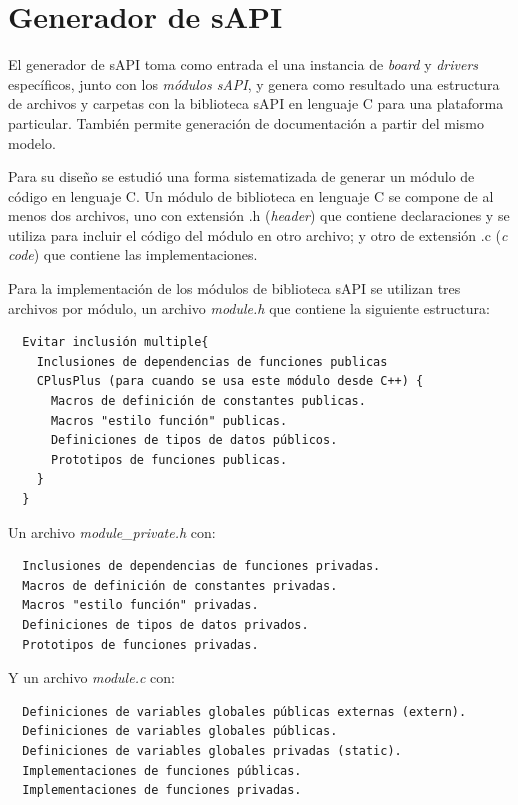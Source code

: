 \section{Generador de sAPI}
\label{sec:modelGenerator}

El generador de sAPI toma como entrada el una instancia de \emph{board} y \emph{drivers} específicos, junto con los \emph{módulos sAPI}, y genera como resultado una estructura de archivos y carpetas con la biblioteca sAPI en lenguaje C para una plataforma particular. También permite generación de documentación a partir del mismo modelo.

Para su diseño se estudió una forma sistematizada de generar un módulo de código en lenguaje C. Un módulo de biblioteca en lenguaje C se compone de al menos dos archivos, uno con extensión .h (\emph{header}) que contiene declaraciones y se utiliza para incluir el código del módulo en otro archivo; y otro de extensión .c (\emph{c code}) que contiene las implementaciones. 

Para la implementación de los módulos de biblioteca sAPI se utilizan  tres archivos por módulo, un archivo \emph{module.h} que contiene la siguiente estructura:

\begin{verbatim}
  Evitar inclusión multiple{
    Inclusiones de dependencias de funciones publicas
    CPlusPlus (para cuando se usa este módulo desde C++) {
      Macros de definición de constantes publicas.
      Macros "estilo función" publicas.
      Definiciones de tipos de datos públicos.
      Prototipos de funciones publicas.
    }
  }
\end{verbatim}

Un archivo \emph{module\_private.h} con:

\begin{verbatim}
  Inclusiones de dependencias de funciones privadas.
  Macros de definición de constantes privadas.
  Macros "estilo función" privadas.
  Definiciones de tipos de datos privados.
  Prototipos de funciones privadas.
\end{verbatim}

Y un archivo \emph{module.c} con:

\begin{verbatim}
  Definiciones de variables globales públicas externas (extern).
  Definiciones de variables globales públicas.
  Definiciones de variables globales privadas (static).
  Implementaciones de funciones públicas.
  Implementaciones de funciones privadas.
\end{verbatim}

